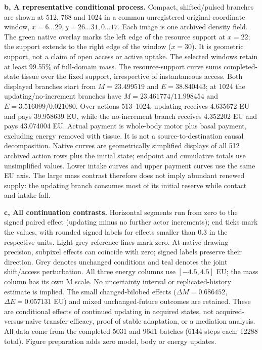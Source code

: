 \textbf{b, A representative conditional process.} Compact, shifted/pulsed branches are shown at 512, 768 and 1024 in a common unregistered original-coordinate window, $x=6\ldots29,y=26\ldots31,0\ldots17$. Each image is one archived density field. The green native overlay marks the left edge of the resource support at $x=22$; the support extends to the right edge of the window ($x=30$). It is geometric support, not a claim of open access or active uptake. The selected windows retain at least 99.55\% of full-domain mass. The resource-support curve sums completed-state tissue over the fixed support, irrespective of instantaneous access. Both displayed branches start from $M=23.499519$ and $E=38.840443$; at 1024 the updating/no-increment branches have $M=23.461774/11.998454$ and $E=3.516099/0.021080$. Over actions 513--1024, updating receives 4.635672 EU and pays 39.958639 EU, while the no-increment branch receives 4.352202 EU and pays 43.074004 EU. Actual payment is whole-body motor plus basal payment, excluding energy removed with tissue. It is not a source-to-destination causal decomposition. Native curves are geometrically simplified displays of all 512 archived action rows plus the initial state; endpoint and cumulative totals use unsimplified values. Lower intake curves and upper payment curves use the same EU axis. The large mass contrast therefore does not imply abundant renewed supply: the updating branch consumes most of its initial reserve while contact and intake fall.

\textbf{c, All continuation contrasts.} Horizontal segments run from zero to the signed paired effect (updating minus no further actor increments); end ticks mark the values, with rounded signed labels for effects smaller than 0.3 in the respective units. Light-grey reference lines mark zero. At native drawing precision, subpixel effects can coincide with zero; signed labels preserve their direction. Grey denotes unchanged conditions and teal denotes the joint shift/access perturbation. All three energy columns use $[-4.5,4.5]$ EU; the mass column has its own M scale. No uncertainty interval or replicated-history estimate is implied. The small changed-bilobed effects ($\Delta M=0.686452$, $\Delta E=0.057131$ EU) and mixed unchanged-future outcomes are retained. These are conditional effects of continued updating in acquired states, not acquired-versus-naive transfer efficacy, proof of stable adaptation, or a mediation analysis. All data come from the completed 5031 and 96d1 batches (6144 steps each; 12288 total). Figure preparation adds zero model, body or energy updates.
